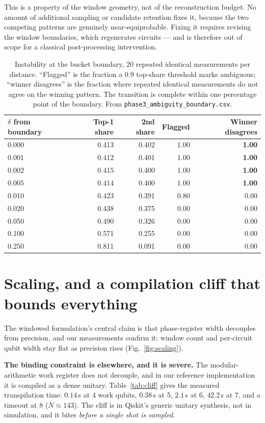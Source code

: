 \documentclass[preprint,11pt]{elsarticle}
\begin{document}
This is a property of the window geometry, not of the reconstruction budget.
No amount of additional sampling or candidate retention fixes it, because
the two competing patterns are genuinely near-equiprobable. Fixing it
requires revising the window boundaries, which regenerates circuits --- and
is therefore out of scope for a classical post-processing intervention.

\begin{table}[htbp]
\centering\small
\caption{Instability at the bucket boundary, 20 repeated identical
measurements per distance. ``Flagged'' is the fraction a $0.9$ top-share
threshold marks ambiguous; ``winner disagrees'' is the fraction where
repeated identical measurements do not agree on the winning pattern. The
transition is complete within one percentage point of the boundary. From
\texttt{phase3\_ambiguity\_boundary.csv}.}
\label{tab:ambiguity}
\begin{tabular}{@{}lrrrr@{}}
\toprule
$\delta$ from boundary & Top-1 share & 2nd share & Flagged & Winner disagrees \\
\midrule
0.000 & 0.413 & 0.402 & 1.00 & \textbf{1.00} \\
0.001 & 0.412 & 0.401 & 1.00 & \textbf{1.00} \\
0.002 & 0.415 & 0.400 & 1.00 & \textbf{1.00} \\
0.005 & 0.414 & 0.400 & 1.00 & \textbf{1.00} \\
0.010 & 0.423 & 0.391 & 0.80 & 0.00 \\
0.020 & 0.438 & 0.375 & 0.00 & 0.00 \\
0.050 & 0.490 & 0.326 & 0.00 & 0.00 \\
0.100 & 0.571 & 0.255 & 0.00 & 0.00 \\
0.250 & 0.811 & 0.091 & 0.00 & 0.00 \\
\bottomrule
\end{tabular}
\end{table}

\section{Scaling, and a compilation cliff that bounds everything}
\label{sec:cliff}

The windowed formulation's central claim is that phase-register width
decouples from precision, and our measurements confirm it: window count and
per-circuit qubit width stay flat as precision rises
(Fig.~\ref{fig:scaling}).

\textbf{The binding constraint is elsewhere, and it is severe.} The
modular-arithmetic work register does not decouple, and in our reference
implementation it is compiled as a dense unitary. Table~\ref{tab:cliff}
gives the measured transpilation time: $0.14$\,s at 4 work qubits,
$0.38$\,s at 5, $2.1$\,s at 6, $42.2$\,s at 7, and a timeout at 8
($N\approx143$). The cliff is in Qiskit's generic unitary synthesis, not in
simulation, and it bites \emph{before a single shot is sampled}.
\end{document}
